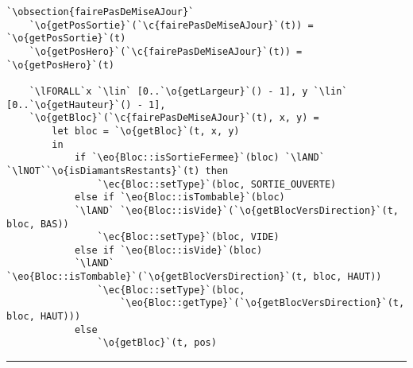 \documentclass{article}
\newcommand{\lAND}{$\land$}
\newcommand{\lNOT}{$\lnot$}
\newcommand{\lFORALL}{$\forall$}
\newcommand{\lin}{$\in$}
\newcommand{\obsection}[1]{\textbf{[#1]}}
\renewcommand{\o}[1]{\textcolor{blue}{#1}}
\renewcommand{\c}[1]{\textcolor{red}{#1}}
\newcommand{\eo}[1]{\textcolor{RoyalPurple}{#1}}
\newcommand{\ec}[1]{\textcolor{BrickRed}{#1}}
\begin{document}
\begin{lstlisting}[caption=Terrain]
`\obsection{fairePasDeMiseAJour}`
	`\o{getPosSortie}`(`\c{fairePasDeMiseAJour}`(t)) = `\o{getPosSortie}`(t)
	`\o{getPosHero}`(`\c{fairePasDeMiseAJour}`(t)) = `\o{getPosHero}`(t)
	
	`\lFORALL`x `\lin` [0..`\o{getLargeur}`() - 1], y `\lin` [0..`\o{getHauteur}`() - 1],
	`\o{getBloc}`(`\c{fairePasDeMiseAJour}`(t), x, y) =
		let bloc = `\o{getBloc}`(t, x, y)
		in
			if `\eo{Bloc::isSortieFermee}`(bloc) `\lAND` `\lNOT``\o{isDiamantsRestants}`(t) then
				`\ec{Bloc::setType}`(bloc, SORTIE_OUVERTE)
			else if `\eo{Bloc::isTombable}`(bloc)
			`\lAND` `\eo{Bloc::isVide}`(`\o{getBlocVersDirection}`(t, bloc, BAS))
				`\ec{Bloc::setType}`(bloc, VIDE)
			else if `\eo{Bloc::isVide}`(bloc)
			`\lAND` `\eo{Bloc::isTombable}`(`\o{getBlocVersDirection}`(t, bloc, HAUT))
				`\ec{Bloc::setType}`(bloc,
					`\eo{Bloc::getType}`(`\o{getBlocVersDirection}`(t, bloc, HAUT)))
			else
				`\o{getBloc}`(t, pos)
\end{lstlisting}
\hrule
\clearpage
\end{document}
